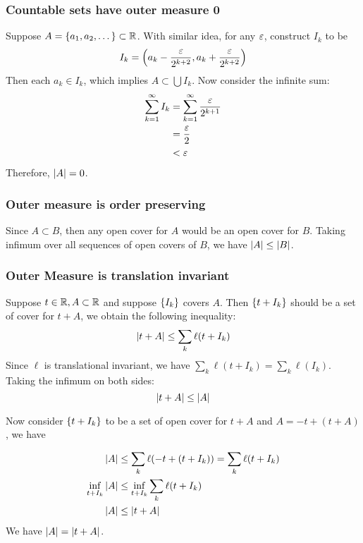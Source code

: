 \subsubsection{Countable sets have outer measure 0}\label{prof:countable set}

\begin{prf*}
Suppose $A = \qty{a_1, a_2, \dots}\subset {\mathbb{R}}$. 
With similar idea, for any ${\varepsilon}$, construct $I_k$ to be
$$I_k = \qty(a_k -\frac{{\varepsilon}}{2^{k+2}}, a_k + \frac{{\varepsilon}}{2^{k+2}})$$
Then each $a_k\in I_k$, which implies $A\subset \bigcup I_k$. Now consider the infinite sum:
\begin{align*}
    \sum_{k=1}^\infty I_k &= \sum_{k=1}^\infty\frac{{\varepsilon}}{2^{k+1}}\\
                          &= \frac{{\varepsilon}}{2}\\
                          &< {\varepsilon}
\end{align*}
Therefore, $\abs{A} = 0$.
\end{prf*}


\subsubsection{Outer measure is order preserving}\label{prof:order preserving}
\begin{prf*}
Since $A\subset B$, then any open cover for $A$ would be an open cover for $B$. Taking infimum over all sequences of open covers of $B$, we have $\abs{A}\leq \abs{B}$. 
\end{prf*}

\subsubsection{Outer Measure is translation invariant}
\label{prof:translation invariant}
\begin{prf*}
Suppose $t\in {\mathbb{R}}, A\subset {\mathbb{R}}$ and suppose $\qty{I_k}$ covers $A$. Then $\qty{t+I_k}$ should be a set of cover for $t+A$, we obtain the following inequality: 
$$\abs{t+A} \leq \sum_{k} \ell(t+I_k)$$
Since $\ell$ is translational invariant, we have $\sum_{k} \ell(t+I_k) = \sum_{k} \ell(I_k)$. Taking the infimum on both sides: 
$$\abs{t+A} \leq \abs{A}$$

Now consider $\qty{t+I_k}$ to be a set of open cover for $t+A$ and $A = -t+(t+A)$, we have 

\begin{align*}
	\abs{A} &\leq \sum_{k} \ell(-t + (t+I_k)) = \sum_{k} \ell (t+I_k)\\
	\inf_{t+I_k} \abs{A} &\leq	\inf_{t+I_k}  \sum_{k} \ell (t+I_k)\\
	\abs{A} &\leq \abs{t+A}
\end{align*}
We have $\abs{A} = \abs{t+A}$. 
\end{prf*}


